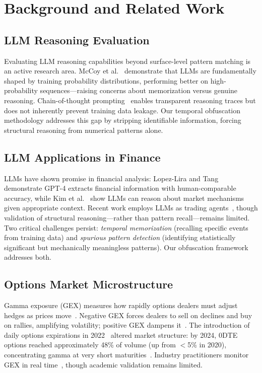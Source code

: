 \section{Background and Related Work}
\label{sec:related}

\subsection{LLM Reasoning Evaluation}

Evaluating LLM reasoning capabilities beyond surface-level pattern matching is an active research area. McCoy et al.~\cite{mccoy2023embers} demonstrate that LLMs are fundamentally shaped by training probability distributions, performing better on high-probability sequences---raising concerns about memorization versus genuine reasoning. Chain-of-thought prompting~\cite{openai2024reasoning} enables transparent reasoning traces but does not inherently prevent training data leakage. Our temporal obfuscation methodology addresses this gap by stripping identifiable information, forcing structural reasoning from numerical patterns alone.

\subsection{LLM Applications in Finance}

LLMs have shown promise in financial analysis: Lopez-Lira and Tang~\cite{lopez2023can} demonstrate GPT-4 extracts financial information with human-comparable accuracy, while Kim et al.~\cite{kim2024financial} show LLMs can reason about market mechanisms given appropriate context. Recent work employs LLMs as trading agents~\cite{yang2024tradingagents}, though validation of structural reasoning---rather than pattern recall---remains limited. Two critical challenges persist: \textit{temporal memorization} (recalling specific events from training data) and \textit{spurious pattern detection} (identifying statistically significant but mechanically meaningless patterns). Our obfuscation framework addresses both.

\subsection{Options Market Microstructure}

Gamma exposure (GEX) measures how rapidly options dealers must adjust hedges as prices move~\cite{black1973pricing}. Negative GEX forces dealers to sell on declines and buy on rallies, amplifying volatility; positive GEX dampens it~\cite{ni2005stock,baltussen2021hedging}. The introduction of daily options expirations in 2022~\cite{cboe2024zero} altered market structure: by 2024, 0DTE options reached approximately 48\% of volume (up from $<$5\% in 2020), concentrating gamma at very short maturities~\cite{dim2025zero}. Industry practitioners monitor GEX in real time~\cite{spotgamma2021,fishman2023gamma}, though academic validation remains limited.

